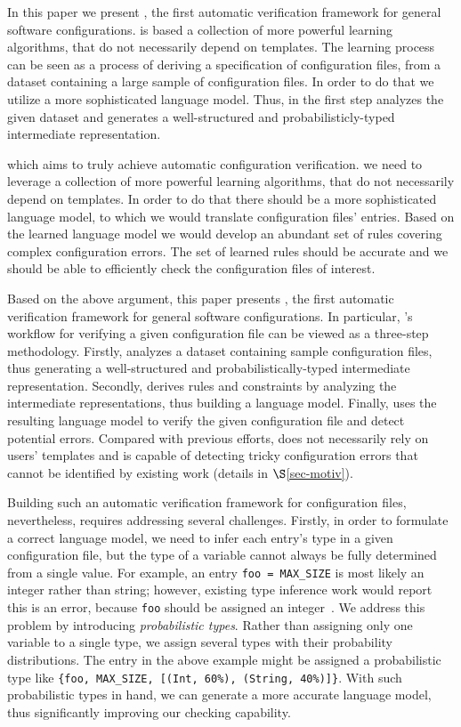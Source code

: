 In this paper we present \app, the first automatic verification framework
for general software configurations. \app is based a collection of more powerful learning 
algorithms, that do not necessarily depend on templates. The learning process can be seen as a process of deriving  
a specification of configuration files, from a dataset containing a large sample of configuration files. In order to do that
we utilize a more sophisticated language model. Thus, in the first step \app analyzes the given dataset and generates a 
well-structured and probabilisticly-typed 
intermediate representation.




which aims to truly  achieve automatic configuration verification. we need to leverage a collection of more powerful learning 
algorithms, that do not necessarily depend on templates. In order to do that
there should be a more sophisticated language model, to which we would translate configuration files' entries.
Based on  the learned language model we would develop an abundant set of rules covering 
complex configuration errors. The set of learned rules should be accurate and we should be able to efficiently check 
the configuration files
of interest.

Based on the above argument, 
this paper presents \app, the first automatic verification framework
for general software configurations.
In particular, \app's workflow for verifying a given configuration file
can be viewed as a three-step methodology.
Firstly, \app analyzes a dataset containing sample configuration files,
thus generating a well-structured and probabilistically-typed 
intermediate representation.
Secondly, \app derives rules and constraints by analyzing
the intermediate representations, thus building a language model.
Finally, \app uses the resulting language model
to verify the given configuration file and detect potential errors.
Compared with previous efforts,
\app does not necessarily rely on users' templates 
and is capable of detecting tricky configuration errors that
cannot be identified by existing work (details in $\S$\ref{sec-motiv}). 

Building such an automatic verification framework for
configuration files, nevertheless, requires addressing several challenges. 
Firstly, in order to formulate a correct language model, 
we need to infer each entry's type in a given configuration file, but 
the type of a variable cannot always be fully determined 
from a single value. 
For example, an entry {\tt foo = MAX\_SIZE} is most likely
an integer rather than string; however, existing type inference 
work would report this is an error, because {\tt foo} should be assigned
an integer~\cite{zhang14encore}.  We address this problem by introducing 
{\emph{probabilistic types}}.
Rather than assigning only one variable to a single type, 
we assign several types with their probability distributions. 
The entry in the above example might be assigned 
a probabilistic type like 
{\tt \{foo, MAX\_SIZE, [(Int, 60\%), (String, 40\%)]\}}.
With such probabilistic types in hand,
we can generate a more accurate language model,
thus significantly improving our checking capability.

